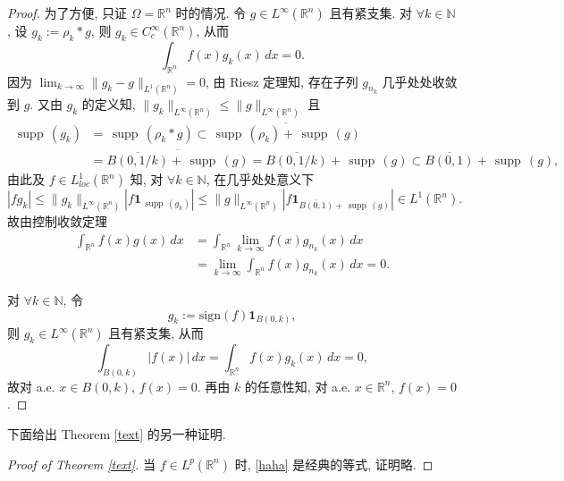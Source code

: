 \documentclass[a4paper,11pt]{article}
\theoremstyle{definition}
\def \supp {\mathop\mathrm{\,supp\,}}
\begin{document}
\begin{CJK*}{UTF8}{gbsn}
\begin{proof}
    为了方便, 只证 $ \Omega = \mathbb{R}^n $ 时的情况.
    令 $ g \in L^\infty(\mathbb{R}^n) $ 且有紧支集.
    对 $ \forall k \in \mathbb{N} $, 设 $ g_k := \rho_k * g $, 则 $ g_k \in C_c^\infty(\mathbb{R}^n) $,
    从而
    $$
        \int_{\mathbb{R}^n} f(x) g_k(x) \, dx = 0.
    $$
    因为 $ \lim_{k \to \infty} \| g_k - g \|_{L^1(\mathbb{R}^n)} = 0 $, 由 Riesz 定理知, 
    存在子列 $ g_{n_k} $ 几乎处处收敛到 $ g $. 又由 $ g_k $ 的定义知, 
    $ \|g_k\|_{L^\infty(\mathbb{R}^n)} \leq \|g\|_{L^\infty(\mathbb{R}^n)} $ 
    且 
    \begin{align*}
        \supp(g_k) &= \supp(\rho_k * g) 
                   \subset \overline{\supp(\rho_k) + \supp(g)} \\
                   &= \overline{\overline{B(0, 1/k)} + \supp(g)} 
                   = \overline{B(0, 1/k)} + \supp(g)
                   \subset \overline{B(0, 1)} + \supp(g), 
    \end{align*}
    由此及 $ f \in L^1_{loc}(\mathbb{R}^n) $ 知, 
    对 $ \forall k \in \mathbb{N} $, 在几乎处处意义下
    $$
        |f g_k| \leq \|g_k\|_{L^\infty(\mathbb{R}^n)} |f \mathbf{1}_{\supp(g_k)}|
                \leq \|g\|_{L^\infty(\mathbb{R}^n)} \left|f \mathbf{1}_{\overline{B(0, 1)} + \supp(g)}\right| 
                \in L^1(\mathbb{R}^n).
    $$
    故由控制收敛定理
    \begin{align*}
        \int_{\mathbb{R}^n} f(x) g(x) \, dx
            &= \int_{\mathbb{R}^n} \lim_{k \to \infty} f(x) g_{n_k}(x) \, dx \\
            &= \lim_{k \to \infty} \int_{\mathbb{R}^n} f(x) g_{n_k}(x) \, dx = 0.
    \end{align*}
    
    对 $ \forall k \in \mathbb{N} $, 令
    $$
        g_k := \mathrm{sign} (f) \mathbf{1}_{B(0, k)},
    $$
    则 $ g_k \in L^\infty(\mathbb{R}^n) $ 且有紧支集, 从而
    $$
        \int_{B(0, k)} |f(x)| \, dx
            = \int_{\mathbb{R}^n} f(x) g_k(x) \, dx
            = 0,
    $$
    故对 a.e. $ x \in B(0, k) $, $ f(x) = 0 $.
    再由 $ k $ 的任意性知, 对 a.e. $ x \in \mathbb{R}^n $, $ f(x) = 0 $.
\end{proof}

下面给出 Theorem \ref{text} 的另一种证明.

\begin{proof}[Proof of Theorem \ref{text}]
    当 $ f \in L^p(\mathbb{R}^n) $ 时, \eqref{haha} 是经典的等式, 证明略.
    

\end{proof}
\end{CJK*}
\end{document}
